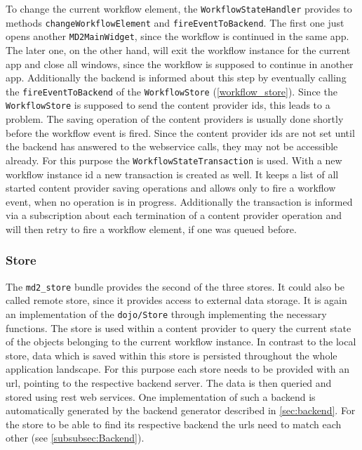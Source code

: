 To change the current workflow element, the \lstinline|WorkflowStateHandler| provides to methods \lstinline|changeWorkflowElement| and \lstinline|fireEventToBackend|. 
The first one  just opens another \lstinline|MD2MainWidget|, since the workflow is continued in the same app.
The later one, on the other hand, will exit the workflow instance for the current app and close all windows, since the workflow is supposed to continue in another app. Additionally the backend is informed about this step by eventually calling the \lstinline|fireEventToBackend| of the \lstinline|WorkflowStore| (\cref{workflow_store}). Since the \lstinline|WorkflowStore| is supposed to send the content provider ids, this leads to a problem. 
The saving operation of the content providers is usually done shortly before the workflow event is fired. Since the content provider ids are not set until the backend has answered to the webservice calls, they may not be accessible already. For this purpose the \lstinline|WorkflowStateTransaction| is used. 
With a new workflow instance id a new transaction is created as well. It keeps a list of all started content provider saving operations and allows only to fire a workflow event, when no operation is in progress. Additionally the transaction is informed via a subscription about each termination of a content provider operation and will then retry to fire a workflow element, if one was queued before.

\subsubsection{Store}\label{store}

The \lstinline|md2_store| bundle provides the second of the three stores. It could also be called remote store, since it provides access to external data storage. It is again an implementation of the \lstinline|dojo/Store| through implementing the necessary functions. The store is used within a content provider to query the current state of the objects belonging to the current workflow instance. In contrast to the local store, data which is saved within this store is persisted throughout the whole application landscape. For this purpose each store needs to be provided with an url, pointing to the respective backend server. The data is then queried and stored using rest web services. One implementation of such a backend is automatically generated by the backend generator described in \cref{sec:backend}. For the store to be able to find its respective backend the urls need to match each other (see \cref{subsubsec:Backend}). 

